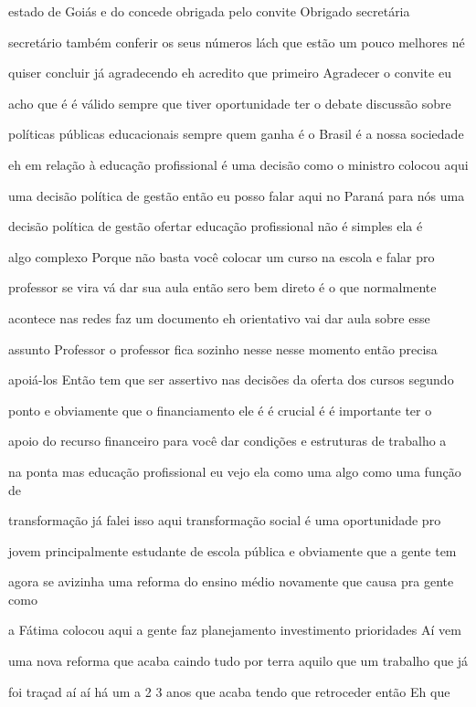 \documentclass[a4paper,12pt]{article}
\begin{document}
estado de Goiás e do concede obrigada pelo convite Obrigado secretária

secretário também conferir os seus números lách que estão um pouco melhores né

quiser concluir já agradecendo eh acredito que primeiro Agradecer o convite eu

acho que é é válido sempre que tiver oportunidade ter o debate discussão sobre

políticas públicas educacionais sempre quem ganha é o Brasil é a nossa sociedade

eh em relação à educação profissional é uma decisão como o ministro colocou aqui

uma decisão política de gestão então eu posso falar aqui no Paraná para nós uma

decisão política de gestão ofertar educação profissional não é simples ela é

algo complexo Porque não basta você colocar um curso na escola e falar pro

professor se vira vá dar sua aula então sero bem direto é o que normalmente

acontece nas redes faz um documento eh orientativo vai dar aula sobre esse

assunto Professor o professor fica sozinho nesse nesse momento então precisa

apoiá-los Então tem que ser assertivo nas decisões da oferta dos cursos segundo

ponto e obviamente que o financiamento ele é é crucial é é importante ter o

apoio do recurso financeiro para você dar condições e estruturas de trabalho a

na ponta mas educação profissional eu vejo ela como uma algo como uma função de

transformação já falei isso aqui transformação social é uma oportunidade pro

jovem principalmente estudante de escola pública e obviamente que a gente tem

agora se avizinha uma reforma do ensino médio novamente que causa pra gente como

a Fátima colocou aqui a gente faz planejamento investimento prioridades Aí vem

uma nova reforma que acaba caindo tudo por terra aquilo que um trabalho que já

foi traçad aí aí há um a 2 3 anos que acaba tendo que retroceder então Eh que
\end{document}
